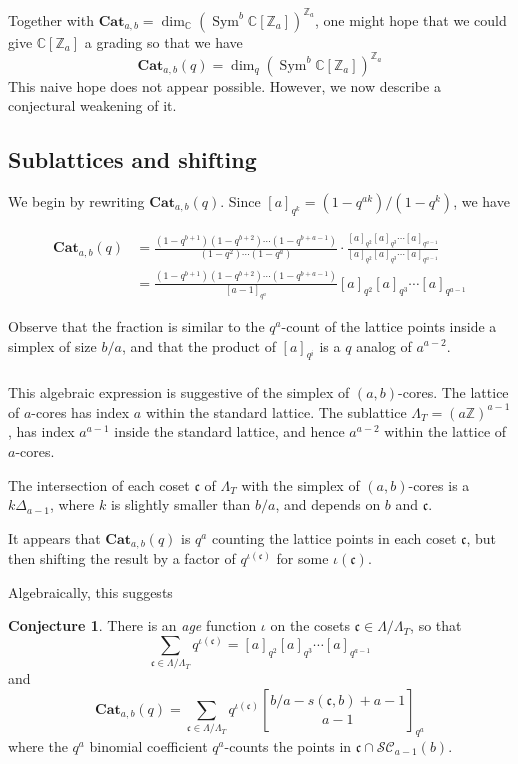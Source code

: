 \documentclass{amsart}[12pt]
\theoremstyle{definition}
\newtheorem{conjecture}[dummy]{Conjecture}
\newcommand{\Z}{\mathbb{Z}}
\newcommand{\C}{\mathbb{C}}
\newcommand{\Cat}{\mathbf{Cat}}
\DeclareMathOperator{\Sym}{Sym}
\begin{document}
Together with $\Cat_{a,b}=\dim_\C(\Sym^b\C[\Z_a])^{\Z_a}$, one
might hope that we could give $\C[\Z_a]$ a grading so that we have
$$\Cat_{a,b}(q)=\dim_q(\Sym^b \C[\Z_a])^{\Z_a}$$
This naive hope does not appear possible.  However, we now describe a
conjectural weakening of it.

\subsection{Sublattices and shifting}

We begin by rewriting $\Cat_{a,b}(q)$.  Since $[a]_{q^k}=(1-q^{ak})/(1-q^k)$, we have

\begin{align*}
\Cat_{a,b}(q)&=\frac{(1-q^{b+1})(1-q^{b+2})\cdots (1-q^{b+a-1})}{(1-q^2)\cdots(1-q^a)} \cdot \frac{[a]_{q^2}[a]_{q^3}\cdots[a]_{q^{a-1}}}{[a]_{q^2}[a]_{q^3}\cdots[a]_{q^{a-1}}} \\
&=\frac{(1-q^{b+1})(1-q^{b+2})\cdots (1-q^{b+a-1})}{[a-1]_{q^a}}[a]_{q^2}[a]_{q^3}\cdots[a]_{q^{a-1}}
\end{align*}

Observe that the fraction is similar to the $q^a$-count of the lattice
points inside a simplex of size $b/a$, and that the product of $[a]_{q^i}$ is a $q$ analog of $a^{a-2}$.

\subsubsection{}
This algebraic expression is suggestive of the simplex of
$(a,b)$-cores.  The lattice of $a$-cores has index $a$ within
the standard lattice.  The sublattice $\Lambda_T=(a\Z)^{a-1}$, has index $a^{a-1}$ inside the standard lattice, and hence $a^{a-2}$ within the lattice of $a$-cores.

The intersection of each coset $\mathfrak{c}$ of $\Lambda_T$ with the simplex of
$(a,b)$-cores is a $k\Delta_{a-1}$, where $k$ is slightly smaller than $b/a$, and depends on $b$ and $\mathfrak{c}$.


It appears that
$\Cat_{a,b}(q)$ is $q^a$ counting the lattice points in each coset $\mathfrak{c}$,
but then shifting the result by a factor of $q^{\iota(\mathfrak{c})}$ for some $\iota(\mathfrak{c})$.

Algebraically, this suggests
\begin{conjecture} \label{conj:cosets}
There is an \emph{age} function $\iota$ on the cosets $\mathfrak{c}\in\Lambda/\Lambda_T$, so that
$$\sum_{\mathfrak{c}\in\Lambda/\Lambda_T} q^{\iota(\mathfrak{c})}=[a]_{q^2}[a]_{q^3}\cdots[a]_{q^{a-1}}$$
 and
$$\Cat_{a,b}(q)=\sum_{\mathfrak{c}\in\Lambda/\Lambda_T} q^{\iota(\mathfrak{c})} {b/a-s(\mathfrak{c},b)+a-1\brack a-1}_{q^a}$$
where the $q^a$ binomial coefficient $q^a$-counts the points in $\mathfrak{c}\cap \mathcal{SC}_{a-1}(b)$.
\end{conjecture}
\end{document}
